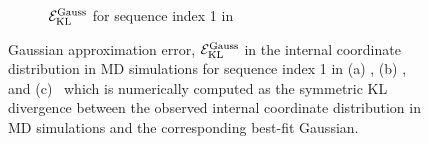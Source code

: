 \begin{figure}[H]
\begin{subfigure}{15cm}
    \caption{${\mathcal E}_{\text{KL}}^{\text{Gauss}}$ for sequence index 1 in \Lbdrh}
  \end{subfigure}
\caption{
Gaussian approximation error, ${\mathcal E}_{\text{KL}}^{\text{Gauss}}$ in the internal coordinate distribution in MD simulations for sequence index 1 in (a) \Lbdna, (b) \Lbrna, and (c) \Lbdrh \ which is numerically computed as the symmetric KL divergence between the observed internal coordinate distribution in MD simulations and the corresponding best-fit Gaussian.
}
\label{c3:fig_gauss_err}
\end{figure} 
